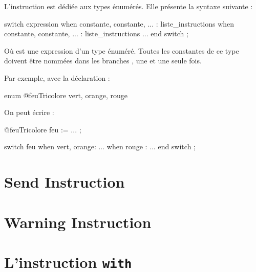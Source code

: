

















L'instruction  est dédiée aux types énumérés. Elle présente la syntaxe suivante :

\begin{galgascode}
switch expression
when constante, constante, ... :
  liste_instructions
when constante, constante, ... :
  liste_instructions
...
end switch ;
\end{galgascode}


Où  est une expression d'un type énuméré. Toutes les constantes de ce type doivent être nommées dans les branches , une et une seule fois.

Par exemple, avec la déclaration :

\begin{galgascode}
enum @feuTricolore {
  vert, orange, rouge   
}
\end{galgascode}

On peut écrire :

\begin{galgascode}
@feuTricolore feu := ... ;

switch feu
when vert, orange:
  ...
when rouge :
  ...
end switch ;
\end{galgascode}










\section{Send Instruction}




\section{Warning Instruction}




\section{L'instruction \texttt{with}}


